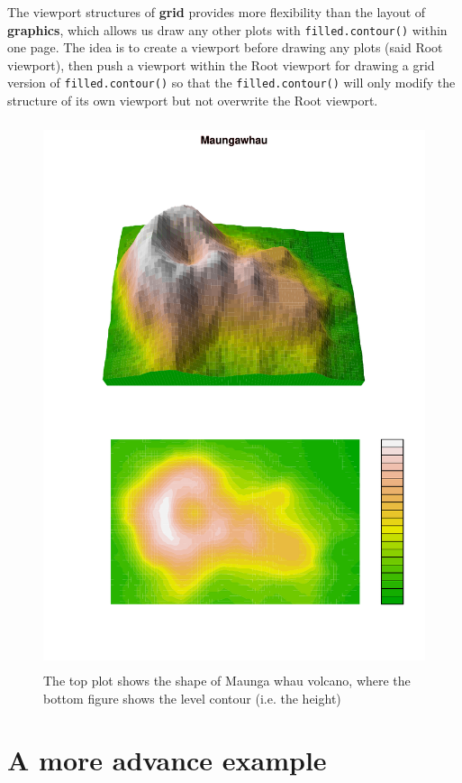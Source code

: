 \documentclass{report}
\begin{document}
The viewport structures of \textbf{grid} provides more flexibility than the layout of \textbf{graphics}, which allows us draw any other plots with \texttt{filled.contour()} within one page. The idea is to create a viewport before drawing any plots (said Root viewport), then push a viewport within the Root viewport for drawing a grid version of \texttt{filled.contour()} so that the \texttt{filled.contour()} will only modify the structure of its own viewport but not overwrite the Root viewport.\\
\begin{figure}[H]
	\begin{center}
		\includegraphics[height = 16cm, width = 12cm]{figure/Chapter6_example_3_1.pdf}
		\caption{The top plot shows the shape of Maunga whau volcano, where the bottom figure shows the level contour (i.e. the height)}
		\label{Example_6.2.1}
	\end{center}
\end{figure}


\newpage
\section{A more advance example}
\end{document}
